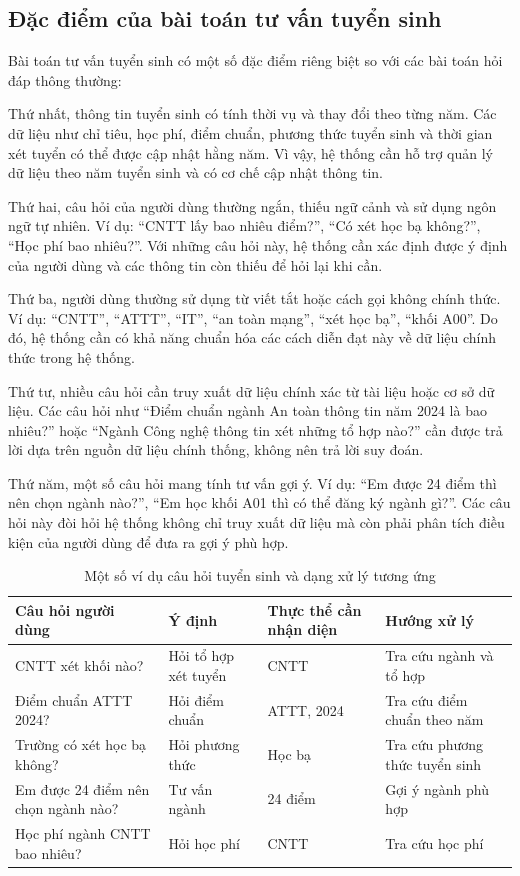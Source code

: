\subsection{Đặc điểm của bài toán tư vấn tuyển sinh}

Bài toán tư vấn tuyển sinh có một số đặc điểm riêng biệt so với các bài toán hỏi đáp thông thường:

Thứ nhất, thông tin tuyển sinh có tính thời vụ và thay đổi theo từng năm. Các dữ liệu như chỉ tiêu, học phí, điểm chuẩn, phương thức tuyển sinh và thời gian xét tuyển có thể được cập nhật hằng năm. Vì vậy, hệ thống cần hỗ trợ quản lý dữ liệu theo năm tuyển sinh và có cơ chế cập nhật thông tin.

Thứ hai, câu hỏi của người dùng thường ngắn, thiếu ngữ cảnh và sử dụng ngôn ngữ tự nhiên. Ví dụ: ``CNTT lấy bao nhiêu điểm?'', ``Có xét học bạ không?'', ``Học phí bao nhiêu?''. Với những câu hỏi này, hệ thống cần xác định được ý định của người dùng và các thông tin còn thiếu để hỏi lại khi cần.

Thứ ba, người dùng thường sử dụng từ viết tắt hoặc cách gọi không chính thức. Ví dụ: ``CNTT'', ``ATTT'', ``IT'', ``an toàn mạng'', ``xét học bạ'', ``khối A00''. Do đó, hệ thống cần có khả năng chuẩn hóa các cách diễn đạt này về dữ liệu chính thức trong hệ thống.

Thứ tư, nhiều câu hỏi cần truy xuất dữ liệu chính xác từ tài liệu hoặc cơ sở dữ liệu. Các câu hỏi như ``Điểm chuẩn ngành An toàn thông tin năm 2024 là bao nhiêu?'' hoặc ``Ngành Công nghệ thông tin xét những tổ hợp nào?'' cần được trả lời dựa trên nguồn dữ liệu chính thống, không nên trả lời suy đoán.

Thứ năm, một số câu hỏi mang tính tư vấn gợi ý. Ví dụ: ``Em được 24 điểm thì nên chọn ngành nào?'', ``Em học khối A01 thì có thể đăng ký ngành gì?''. Các câu hỏi này đòi hỏi hệ thống không chỉ truy xuất dữ liệu mà còn phải phân tích điều kiện của người dùng để đưa ra gợi ý phù hợp.

\begin{table}[H]
    \centering
    \caption{Một số ví dụ câu hỏi tuyển sinh và dạng xử lý tương ứng}
    \label{tab:admission_question_examples}
    \begin{tabular}{|p{4.1cm}|p{3.2cm}|p{3.1cm}|p{3.8cm}|}
        \hline
        \textbf{Câu hỏi người dùng} & \textbf{Ý định} & \textbf{Thực thể cần nhận diện} & \textbf{Hướng xử lý} \\ \hline
        CNTT xét khối nào? & Hỏi tổ hợp xét tuyển & CNTT & Tra cứu ngành và tổ hợp \\ \hline
        Điểm chuẩn ATTT 2024? & Hỏi điểm chuẩn & ATTT, 2024 & Tra cứu điểm chuẩn theo năm \\ \hline
        Trường có xét học bạ không? & Hỏi phương thức & Học bạ & Tra cứu phương thức tuyển sinh \\ \hline
        Em được 24 điểm nên chọn ngành nào? & Tư vấn ngành & 24 điểm & Gợi ý ngành phù hợp \\ \hline
        Học phí ngành CNTT bao nhiêu? & Hỏi học phí & CNTT & Tra cứu học phí \\ \hline
    \end{tabular}
\end{table}

